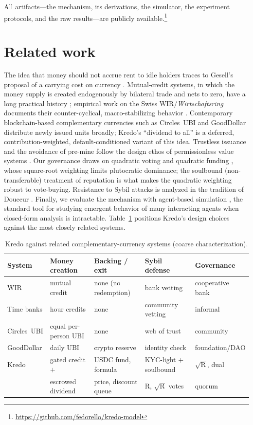 \documentclass[11pt]{article}
\theoremstyle{plain}
\theoremstyle{definition}
\theoremstyle{remark}
\newcommand{\R}{\mathrm{R}}
\begin{document}
All artifacts---the mechanism, its derivations, the simulator, the experiment protocols, and the raw results---are publicly available.\footnote{\url{https://github.com/fedorello/kredo-model}}

\section{Related work}\label{sec:related}

The idea that money should not accrue rent to idle holders traces to Gesell's proposal of a carrying cost on currency \cite{gesell1916}. Mutual-credit systems, in which the money supply is created endogenously by bilateral trade and nets to zero, have a long practical history \cite{greco2009}; empirical work on the Swiss WIR/\emph{Wirtschaftsring} documents their counter-cyclical, macro-stabilizing behavior \cite{stodder2009}. Contemporary blockchain-based complementary currencies such as Circles~UBI \cite{circles2020} and GoodDollar \cite{gooddollar2021} distribute newly issued units broadly; Kredo's ``dividend to all'' is a deferred, contribution-weighted, default-conditioned variant of this idea. Trustless issuance and the avoidance of pre-mine follow the design ethos of permissionless value systems \cite{nakamoto2008}. Our governance draws on quadratic voting \cite{lalley2018} and quadratic funding \cite{buterin2019}, whose square-root weighting limits plutocratic dominance; the soulbound (non-transferable) treatment of reputation is what makes the quadratic weighting robust to vote-buying. Resistance to Sybil attacks is analyzed in the tradition of Douceur \cite{douceur2002}. Finally, we evaluate the mechanism with agent-based simulation \cite{bonabeau2002}, the standard tool for studying emergent behavior of many interacting agents when closed-form analysis is intractable. Table~\ref{tab:related} positions Kredo's design choices against the most closely related systems.

\begin{table}[h]
\centering
\small
\begin{tabular}{@{}lllll@{}}
\toprule
System & Money creation & Backing / exit & Sybil defense & Governance\\
\midrule
WIR \cite{stodder2009} & mutual credit & none (no redemption) & bank vetting & cooperative bank\\
Time banks \cite{greco2009} & hour credits & none & community vetting & informal\\
Circles~UBI \cite{circles2020} & equal per-person UBI & none & web of trust & community\\
GoodDollar \cite{gooddollar2021} & daily UBI & crypto reserve & identity check & foundation/DAO\\
\addlinespace
Kredo & gated credit $+$ & USDC fund, formula & KYC-light $+$ soulbound & $\sqrt{\R}$, dual\\
      & escrowed dividend & price, discount queue & $\R$, $\sqrt{\R}$ votes & quorum\\
\bottomrule
\end{tabular}
\caption{Kredo against related complementary-currency systems (coarse characterization).}
\label{tab:related}
\end{table}
\end{document}
